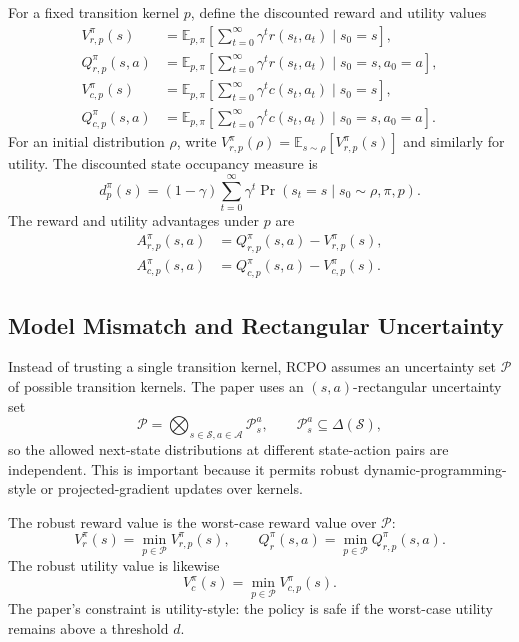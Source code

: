 \documentclass[11pt]{article}
\newcommand{\Sset}{\mathcal S}
\newcommand{\Aset}{\mathcal A}
\newcommand{\Pset}{\mathcal P}
\newcommand{\E}{\mathbb E}
\begin{document}
For a fixed transition kernel $p$, define the discounted reward and utility values
\begin{align}
    V^{\pi}_{r,p}(s)
        &= \E_{p,\pi}\!\left[\sum_{t=0}^{\infty}\gamma^t r(s_t,a_t)\mid s_0=s\right],\\
    Q^{\pi}_{r,p}(s,a)
        &= \E_{p,\pi}\!\left[\sum_{t=0}^{\infty}\gamma^t r(s_t,a_t)\mid s_0=s,a_0=a\right],\\
    V^{\pi}_{c,p}(s)
        &= \E_{p,\pi}\!\left[\sum_{t=0}^{\infty}\gamma^t c(s_t,a_t)\mid s_0=s\right],\\
    Q^{\pi}_{c,p}(s,a)
        &= \E_{p,\pi}\!\left[\sum_{t=0}^{\infty}\gamma^t c(s_t,a_t)\mid s_0=s,a_0=a\right].
\end{align}
For an initial distribution $\rho$, write $V^{\pi}_{r,p}(\rho)=\E_{s\sim\rho}[V^{\pi}_{r,p}(s)]$ and similarly for utility.  The discounted state occupancy measure is
\begin{equation}
    d_p^{\pi}(s)=(1-\gamma)\sum_{t=0}^{\infty}\gamma^t
    \Pr(s_t=s\mid s_0\sim\rho,\pi,p).
\end{equation}
The reward and utility advantages under $p$ are
\begin{align}
    A^{\pi}_{r,p}(s,a)&=Q^{\pi}_{r,p}(s,a)-V^{\pi}_{r,p}(s),\\
    A^{\pi}_{c,p}(s,a)&=Q^{\pi}_{c,p}(s,a)-V^{\pi}_{c,p}(s).
\end{align}

\subsection{Model Mismatch and Rectangular Uncertainty}
Instead of trusting a single transition kernel, RCPO assumes an uncertainty set $\Pset$ of possible transition kernels.  The paper uses an $(s,a)$-rectangular uncertainty set
\begin{equation}
    \Pset = \bigotimes_{s\in\Sset,a\in\Aset}\Pset_s^a,
    \qquad \Pset_s^a\subseteq \Delta(\Sset),
\end{equation}
so the allowed next-state distributions at different state-action pairs are independent.  This is important because it permits robust dynamic-programming-style or projected-gradient updates over kernels.

The robust reward value is the worst-case reward value over $\Pset$:
\begin{equation}
    V_r^{\pi}(s)=\min_{p\in\Pset}V_{r,p}^{\pi}(s),
    \qquad
    Q_r^{\pi}(s,a)=\min_{p\in\Pset}Q_{r,p}^{\pi}(s,a).
\end{equation}
The robust utility value is likewise
\begin{equation}
    V_c^{\pi}(s)=\min_{p\in\Pset}V_{c,p}^{\pi}(s).
\end{equation}
The paper's constraint is utility-style: the policy is safe if the worst-case utility remains above a threshold $d$.
\end{document}
